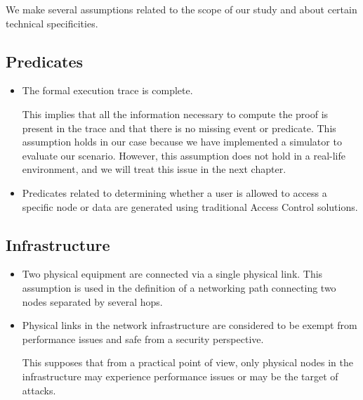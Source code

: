 We make several assumptions related to the scope of our study and about certain technical specificities.

\subsection{Predicates}

\begin{itemize}
    \item The formal execution trace is complete.
    
    This implies that all the information necessary to compute the proof is present in the trace and that there is no missing event or predicate.
    This assumption holds in our case because we have implemented a simulator to evaluate our scenario. However, this assumption does not hold in a real-life environment, and we will treat this issue in the next chapter.

    \item Predicates related to determining whether a user is allowed to access a specific node or data are generated using traditional Access Control solutions.
    
\end{itemize}


\subsection{Infrastructure}
\begin{itemize}

    \item Two physical equipment are connected via a single physical link. This assumption is used in the definition of a networking path connecting two nodes separated by several hops.

    \item Physical links in the network infrastructure are considered to be exempt from performance issues and safe from a security perspective.
    
    This supposes that from a practical point of view, only physical nodes in the infrastructure may experience performance issues or may be the target of attacks.
\end{itemize}

